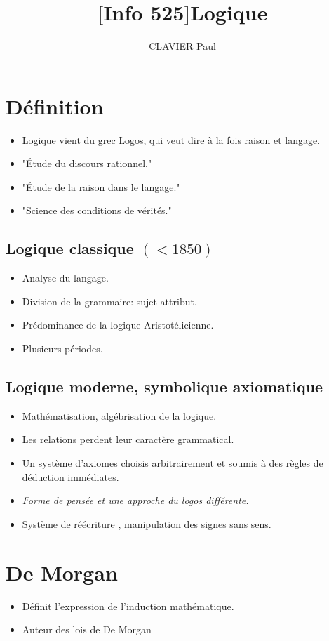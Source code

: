 \documentclass[10pt,a4paper]{article}
\author{CLAVIER Paul}
\title{[Info 525]Logique}
\begin{document}
\maketitle
\newpage
\tableofcontents
\newpage
\section{Définition}
\begin{itemize}
\item Logique vient du grec Logos, qui veut dire à la fois raison et langage.
\item "Étude du discours rationnel."
\item "Étude de la raison dans le langage."
\item "Science des conditions de vérités."
\end{itemize}
\subsection{Logique classique $(<1850)$}
\begin{itemize}
\item Analyse du langage.
\item Division de la grammaire: sujet attribut.
\item Prédominance de la logique Aristotélicienne.
\item Plusieurs périodes.
\end{itemize}
\subsection{Logique moderne, symbolique axiomatique}
\begin{itemize}
\item Mathématisation, algébrisation de la logique.
\item Les relations perdent leur caractère grammatical.
\item Un système d'axiomes choisis arbitrairement et soumis à des règles de déduction immédiates.
\item \emph{Forme de pensée et une approche du logos différente.}
\item Système de réécriture , manipulation des signes sans sens.
\end{itemize}
\section{De Morgan}
\begin{itemize}
\item Définit l'expression de l'induction mathématique.
\item Auteur des lois de De Morgan
\end{itemize}
\end{document}
